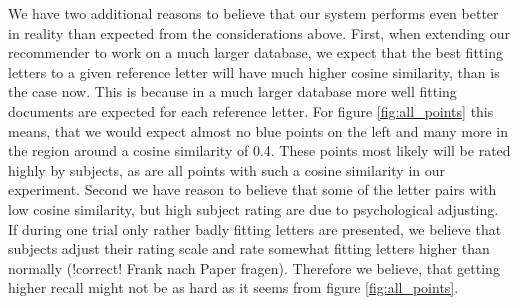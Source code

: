 We have two additional reasons to believe that our system performs even better in reality than expected from the considerations above. First, when extending our recommender to work on a much larger database, we expect that the best fitting letters to a given reference letter will have much higher cosine similarity, than is the case now. This is because in a much larger database more well fitting documents are expected for each reference letter. For figure \ref{fig:all_points} this means, that we would expect almost no blue points on the left and many more in the region around a cosine similarity of 0.4. These points most likely will be rated highly by subjects, as are all points with such a cosine similarity in our experiment. Second we have reason to believe that some of the letter pairs with low cosine similarity, but high subject rating are due to psychological adjusting. If during one trial only rather badly fitting letters are presented, we believe that subjects adjust their rating scale and rate somewhat fitting letters higher than normally (!correct! Frank nach Paper fragen). Therefore we believe, that getting higher recall might not be as hard as it seems from figure \ref{fig:all_points}.

